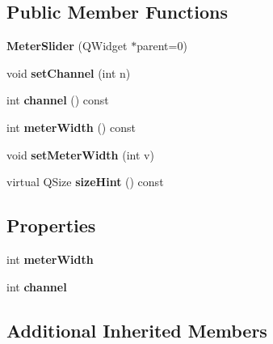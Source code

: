 \subsection*{Public Member Functions}
\begin{DoxyCompactItemize}
\item 
\mbox{\label{class_awl_1_1_meter_slider_ab3224948ee36141d66acc36e4d920841}} 
{\bfseries Meter\+Slider} (Q\+Widget $\ast$parent=0)
\item 
\mbox{\label{class_awl_1_1_meter_slider_af4a0c857bdd3e77d8b3959d470c6f55c}} 
void {\bfseries set\+Channel} (int n)
\item 
\mbox{\label{class_awl_1_1_meter_slider_a758a20f9f3f0addf02a94dbd38e5e154}} 
int {\bfseries channel} () const
\item 
\mbox{\label{class_awl_1_1_meter_slider_aef5322590180f64123f1f7431227ca13}} 
int {\bfseries meter\+Width} () const
\item 
\mbox{\label{class_awl_1_1_meter_slider_a24193ab7eddb46d56cd8ecb6b5774e37}} 
void {\bfseries set\+Meter\+Width} (int v)
\item 
\mbox{\label{class_awl_1_1_meter_slider_afacc5ed9c694838906f95497de073aae}} 
virtual Q\+Size {\bfseries size\+Hint} () const
\end{DoxyCompactItemize}
\subsection*{Properties}
\begin{DoxyCompactItemize}
\item 
\mbox{\label{class_awl_1_1_meter_slider_ac702594aaa754d159412a34c423fe8e6}} 
int {\bfseries meter\+Width}
\item 
\mbox{\label{class_awl_1_1_meter_slider_aed5aae172460aa81f48fc9f529229937}} 
int {\bfseries channel}
\end{DoxyCompactItemize}
\subsection*{Additional Inherited Members}


